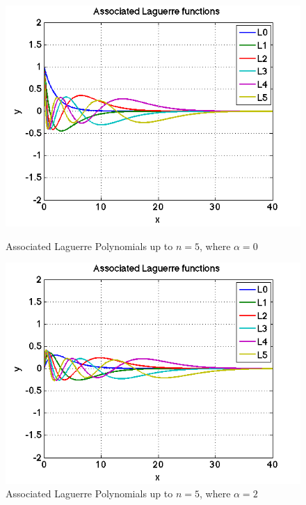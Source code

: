 \documentclass{article}
\begin{document}
\begin{figure}[h]
\centering
	\begin{minipage}[c][][b]{0.45\linewidth}
		\begin{center}
		\includegraphics[scale=0.35]{Matlab/Laguerre/Graphs/psi0.png}  
		\end{center}
		\caption[b]{Associated Laguerre Polynomials up to $n = 5$, where $\alpha = 0$}
		\label{psi0}
	\end{minipage}
\quad\quad\quad\quad
	\begin{minipage}[c][][b]{0.45\linewidth}
		\begin{center}
		\includegraphics[scale=0.35]{Matlab/Laguerre/Graphs/psi2.png}
		\end{center}
		\caption[b]{Associated Laguerre Polynomials up to $n = 5$, where $\alpha = 2$}
		\label{psi2}
	\end{minipage}

\end{figure}
\end{document}
